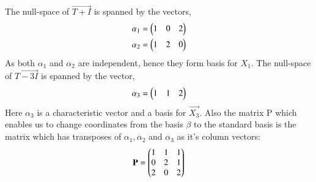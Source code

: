\documentclass[journal,12pt,twocolumn]{IEEEtran}
\begin{document}
The null-space of $\vec{T+I}$ is spanned by the vectors,
\begin{align}
\alpha_1 = \begin{pmatrix}1&0&2\end{pmatrix}\\
\alpha_2 = \begin{pmatrix}1&2&0\end{pmatrix}
\end{align}
As both $\alpha_1$ and $\alpha_2$ are independent, hence they form basis for $X_1$. The null-space of $\vec{T-3I}$ is spanned by the vector,
\begin{align}
\alpha_3 = \begin{pmatrix}1&1&2\end{pmatrix}
\end{align}
Here $\alpha_3$ is a characteristic vector and a basis for $\vec{X_3}$.
Also the matrix P which enables us to change coordinates from the basis $\beta$ to the standard basis is the matrix which has transposes of $\alpha_1, \alpha_2 $ and $\alpha_3$ as it's column vectors:
\begin{align}
\mathbf{P} = \begin{pmatrix}1&1&1\\0&2&1\\2&0&2\end{pmatrix}
\end{align} 
\end{document}
